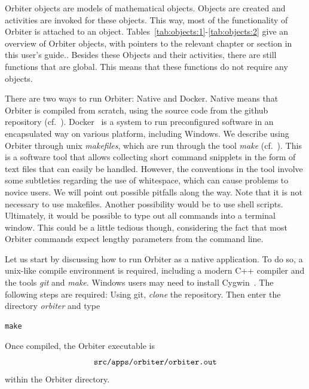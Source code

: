 Orbiter objects are 
models of mathematical objects. 
Objects are created and activities are invoked for these objects.
This way, most of the functionality of Orbiter is attached to an object. 
Tables~\ref{tab:objects:1}-\ref{tab:objects:2} give an overview of Orbiter objects, 
with pointers to the relevant chapter or section in this user's guide..
Besides these Objects and their activities, there are still functions that are global. 
This means that these functions do not require any objects.


There are two ways to run Orbiter: Native and Docker.
Native means that Orbiter is compiled from scratch, 
using the source code from the github repository (cf.~\cite{Orbiter}).
Docker~\cite{docker} is a system to run preconfigured software in an encapsulated way on various platform, 
including Windows.
We describe using Orbiter through unix {\em makefiles}, 
which are run through the tool {\em make} (cf.~\cite{make}). 
This is a software tool that allows collecting short command snipplets in 
the form of text files that can easily be handled. 
However, the conventions in the tool involve some subtleties regarding the use of whitespace, 
which can cause problems to novice users. 
We will point out possible pitfalls along the way. 
Note that it is not necessary to use makefiles. 
Another possibility would be to use shell scripts. 
Ultimately, it would be possible to type out all commands into a terminal window. 
This could be a little tedious though, considering the fact that 
most Orbiter commands expect lengthy parameters from the command line.

 
\smallskip

Let us start by discussing how to run Orbiter as a native application.
To do so, a unix-like compile environment is required, 
including a modern C++ compiler and the tools {\em git} and {\em make}. 
Windows users may need to install Cygwin~\cite{cygwin}.
The following steps are required:
Using git, {\em clone} the repository. Then enter the directory {\em orbiter} 
and type 
\begin{verbatim}
make
\end{verbatim}
Once compiled, the Orbiter executable is
$$
\verb'src/apps/orbiter/orbiter.out'
$$
within the Orbiter directory. 



